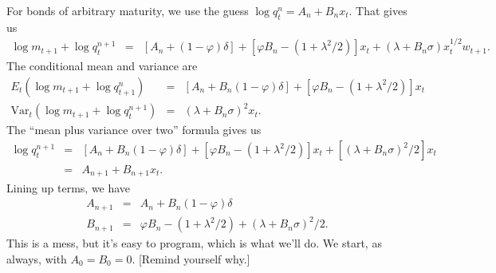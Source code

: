 \documentclass[11pt]{article}
\begin{document}
For bonds of arbitrary maturity,
we use the guess  $ \log q^n_t = A_n + B_n x_t$.
That gives us
\begin{eqnarray*}
    \log m_{t+1} + \log q^{n+1}_t &=&
            [A_n + (1-\varphi) \delta] + [\varphi B_n -(1+\lambda^2/2)] x_t
                    + (\lambda + B_n \sigma) x_t^{1/2} w_{t+1} .
\end{eqnarray*}
The conditional mean and variance are
\begin{eqnarray*}
   E_t \left( \log m_{t+1} + \log q^{n}_{t+1} \right) &=&
            [A_n + B_n (1-\varphi) \delta] + [\varphi B_n -(1+\lambda^2/2)] x_t \\
   \mbox{Var}_t \left( \log m_{t+1} + \log q^{n+1}_t \right) &=&
            (\lambda + B_n \sigma)^2 x_t .
\end{eqnarray*}
The ``mean plus variance over two'' formula gives us
\begin{eqnarray*}
    \log q^{n+1}_t &=&
            [A_n + B_n (1-\varphi) \delta] + [\varphi B_n -(1+\lambda^2/2)] x_t
                    + [(\lambda + B_n \sigma)^2/2]  x_t  \\
                &=& A_{n+1} + B_{n+1} x_t.
\end{eqnarray*}
Lining up terms, we have
\begin{eqnarray*}
    A_{n+1} &=& A_n + B_n (1-\varphi) \delta \\
    B_{n+1} &=& \varphi B_n -(1+\lambda^2/2) + (\lambda + B_n \sigma)^2/2 .
\end{eqnarray*}
This is a mess, but it's easy to program, which is what we'll do.
We start, as always, with $A_0 = B_0 = 0$.
[Remind yourself why.]
\end{document}
